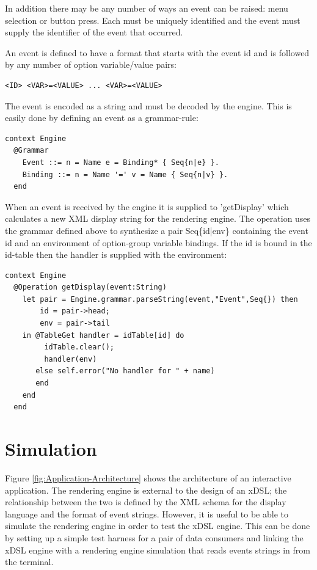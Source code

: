 In addition there may be any number of ways an event can be raised:
menu selection or button press. Each must be uniquely identified and
the event must supply the identifier of the event that occurred. 

An event is defined to have a format that starts with the event id
and is followed by any number of option variable/value pairs:

\begin{lstlisting}
<ID> <VAR>=<VALUE> ... <VAR>=<VALUE>
\end{lstlisting}The event is encoded as a string and must be decoded by the engine.
This is easily done by defining an event as a grammar-rule:

\begin{lstlisting}
context Engine
  @Grammar
    Event ::= n = Name e = Binding* { Seq{n|e} }.
    Binding ::= n = Name '=' v = Name { Seq{n|v} }.
  end
\end{lstlisting}When an event is received by the engine it is supplied to 'getDisplay'
which calculates a new XML display string for the rendering engine.
The operation uses the grammar defined above to synthesize a pair
Seq\{id|env\} containing the event id and an environment of option-group
variable bindings. If the id is bound in the id-table then the handler
is supplied with the environment:

\begin{lstlisting}
context Engine
  @Operation getDisplay(event:String)
    let pair = Engine.grammar.parseString(event,"Event",Seq{}) then
        id = pair->head;
        env = pair->tail
    in @TableGet handler = idTable[id] do
         idTable.clear();
         handler(env)
       else self.error("No handler for " + name)
       end
    end
  end
\end{lstlisting}
\section{Simulation\label{sec:Simulation}}

Figure \ref{fig:Application-Architecture} shows the architecture
of an interactive application. The rendering engine is external to
the design of an xDSL; the relationship between the two is defined
by the XML schema for the display language and the format of event
strings. However, it is useful to be able to simulate the rendering
engine in order to test the xDSL engine. This can be done by setting
up a simple test harness for a pair of data consumers and linking
the xDSL engine with a rendering engine simulation that reads events
strings in from the terminal.

